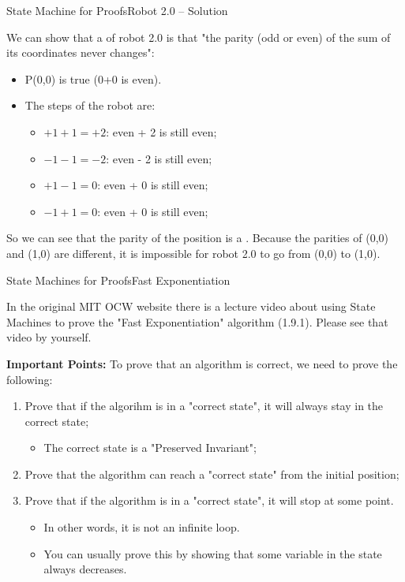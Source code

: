\begin{frame}[t]{State Machine for Proofs}{Robot 2.0 -- Solution}

  We can show that a  of robot 2.0 is that "the parity (odd or even) of the sum of its coordinates never changes":\bigskip

  \begin{itemize}
  \item P(0,0) is true (0+0 is even).
  \item The steps of the robot are:
    \begin{itemize}
    \item $+1+1 = +2$: even + 2 is still even;
    \item $-1-1 = -2$: even - 2 is still even;
    \item $+1-1 = 0$: even + 0 is still even;
    \item $-1+1 = 0$: even + 0 is still even;
    \end{itemize}
  \end{itemize}
  \bigskip

  So we can see that the parity of the position is a . Because the parities of (0,0) and (1,0) are different, it is impossible for robot 2.0 to go from (0,0) to (1,0).
\end{frame}

\begin{frame}[t]{State Machines for Proofs}{Fast Exponentiation}

  In the original MIT OCW website there is a lecture video about using State Machines to prove the "Fast Exponentiation" algorithm (1.9.1). \alert{Please see that video by yourself}.
  \vfill

  {\bf Important Points:} To prove that an algorithm is correct, we need to prove the following:\medskip
  \begin{enumerate}
    \item Prove that if the algorihm is in a "correct state", it will always stay in the correct state;
    \begin{itemize}
      \item The correct state is a "Preserved Invariant";
    \end{itemize} 
    \item Prove that the algorithm can reach a "correct state" from the initial position;
    \item Prove that if the algorithm is in a "correct state", it will stop at some point.
    \begin{itemize}
      \item In other words, it is not an infinite loop.
      \item You can usually prove this by showing that some variable in the state always decreases.
    \end{itemize}
  \end{enumerate}
\end{frame}
